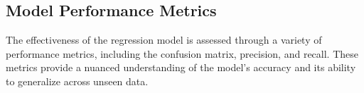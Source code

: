 \subsection{Model Performance Metrics}\label{subsec:performance-review}
    The effectiveness of the regression model is assessed through a variety of performance metrics, including the confusion matrix, precision, and recall.
    These metrics provide a nuanced understanding of the model's accuracy and its ability to generalize across unseen data.
